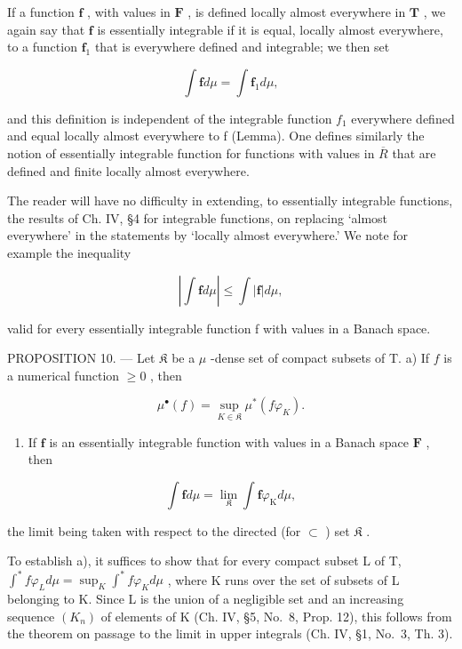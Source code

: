If a function \(\mathbf{f}\) , with values in \(\mathbf{F}\) , is defined locally almost everywhere in \(\mathbf{T}\) , we again say that \(\mathbf{f}\) is essentially integrable if it is equal, locally almost everywhere, to a function \(\mathbf{f}_1\) that is everywhere defined and integrable; we then set

\[
\int \mathbf {f} d \mu = \int \mathbf {f} _ {1} d \mu ,
\]

and this definition is independent of the integrable function \(f_{1}\) everywhere defined and equal locally almost everywhere to f (Lemma). One defines similarly the notion of essentially integrable function for functions with values in \(\overline{R}\) that are defined and finite locally almost everywhere.

The reader will have no difficulty in extending, to essentially integrable functions, the results of Ch. IV, §4 for integrable functions, on replacing `almost everywhere' in the statements by `locally almost everywhere.' We note for example the inequality

\[
\left| \int \mathbf {f} d \mu \right| \leqslant \int | \mathbf {f} | d \mu ,\tag{3}
\]

valid for every essentially integrable function f with values in a Banach space.

PROPOSITION 10. --- Let \(\mathfrak{K}\) be a \(\mu\) -dense set of compact subsets of T. a) If \(f\) is a numerical function \(\geqslant 0\) , then

\[
\mu^ {\bullet} (f) = \sup _ {K \in \mathfrak {K}} \mu^ {*} (f \varphi_ {K}).\tag{4}
\]

\begin{enumerate}
\def\labelenumi{\alph{enumi})}
\setcounter{enumi}{1}
\tightlist
\item
  If \(\mathbf{f}\) is an essentially integrable function with values in a Banach space \(\mathbf{F}\) , then
\end{enumerate}

\[
\int \mathbf {f} d \mu = \lim _ {\mathfrak {K}} \int \mathbf {f} \varphi_ {\mathrm{K}} d \mu ,
\]

the limit being taken with respect to the directed (for \(\subset\) ) set \(\mathfrak{K}\) .

To establish a), it suffices to show that for every compact subset L of T, \(\int^{*}f\varphi_{L}d\mu=\sup_{K}\int^{*}f\varphi_{K}d\mu\) , where K runs over the set of subsets of L belonging to K. Since L is the union of a negligible set and an increasing sequence \((K_{n})\) of elements of K (Ch. IV, §5, No.~8, Prop. 12), this follows from the theorem on passage to the limit in upper integrals (Ch. IV, §1, No.~3, Th. 3).

